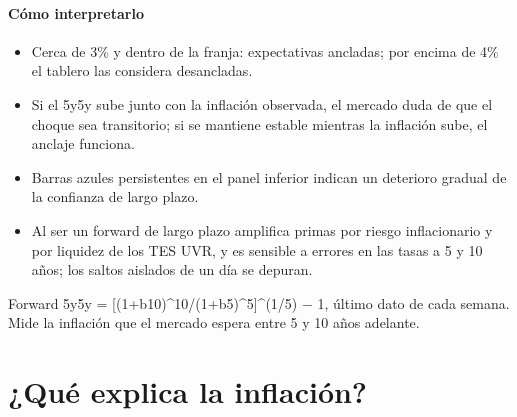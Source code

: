 \paragraph{Cómo interpretarlo}
\begin{itemize}
\item Cerca de 3\% y dentro de la franja: expectativas ancladas; por encima de 4\% el tablero las considera desancladas.
\item Si el 5y5y sube junto con la inflación observada, el mercado duda de que el choque sea transitorio; si se mantiene estable mientras la inflación sube, el anclaje funciona.
\item Barras azules persistentes en el panel inferior indican un deterioro gradual de la confianza de largo plazo.
\item Al ser un forward de largo plazo amplifica primas por riesgo inflacionario y por liquidez de los TES UVR, y es sensible a errores en las tasas a 5 y 10 años; los saltos aislados de un día se depuran.
\end{itemize}
\begin{formulas}[Fórmulas]
\end{formulas}
\begin{metodo}[Metodología]
Forward 5y5y = [(1+b10)\textasciicircum{}10/(1+b5)\textasciicircum{}5]\textasciicircum{}(1/5) − 1, último dato de cada semana. Mide la inflación que el mercado espera entre 5 y 10 años adelante.
\par{}
\end{metodo}

\section{¿Qué explica la inflación?}

